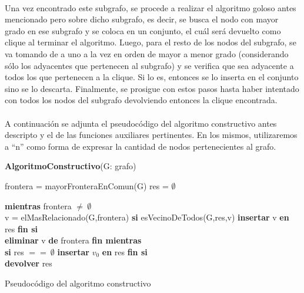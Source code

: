 \paragraph{}
Una vez encontrado este subgrafo, se procede a realizar el algoritmo goloso antes mencionado pero sobre dicho subgrafo, es decir, se busca el nodo con mayor grado en ese subgrafo y se coloca en un conjunto, el cuál será devuelto como clique al terminar el algoritmo. Luego, para el resto de los nodos del subgrafo, se va tomando de a uno a la vez en orden de mayor a menor grado (considerando sólo los adyacentes que pertenecen al subgrafo) y se verifica que sea adyacente a todos los que pertenecen a la clique. Si lo es, entonces se lo inserta en el conjunto sino se lo descarta. Finalmente, se prosigue con estos pasos hasta haber intentado con todos los nodos del subgrafo devolviendo entonces la clique encontrada.

\paragraph{}
A continuación se adjunta el pseudocódigo del algoritmo constructivo antes descripto y el de las funciones auxiliares pertinentes. En los mismos, utilizaremos a ``n'' como forma de expresar la cantidad de nodos pertenecientes al grafo.

\vspace{2em}
\incmargin{3em}
\linesnumbered
{}
\footnotesize 
\textbf{AlgoritmoConstructivo}(G: grafo) \\
\begin{algorithm}[H]
	\BlankLine
	frontera = mayorFronteraEnComun(G) 
	res = $\emptyset$
	\BlankLine

	\textbf{mientras} frontera $\neq\ \emptyset$\\

		\tab v = elMasRelacionado(G,frontera)
		\tab \textbf{si} esVecinoDeTodos(G,res,v)
			\tab \tab \textbf{insertar} v \textbf{en} res
		\tab \textbf{fin si}\\
		\tab \textbf{eliminar} v \textbf{de} frontera
	\textbf{fin mientras}\\

	\textbf{si} res $==\ \emptyset$
		\tab \textbf{insertar} $v_0$ \textbf{en} res
	\textbf{fin si}\\

	\textbf{devolver} res
\caption{Pseudocódigo del algoritmo constructivo}
\end{algorithm}

